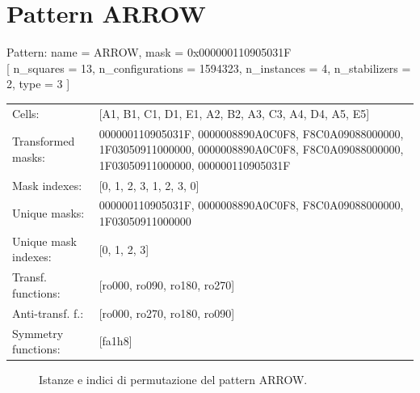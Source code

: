 \newpage

\section{Pattern ARROW}

\begin{tcolorbox}[sharp corners, fontupper=\ttfamily\small, colback=white]
  \noindent Pattern: name = ARROW, mask = 0x000000110905031F\\
  {[} n\_squares = 13, n\_configurations = 1594323,
  n\_instances = 4, n\_stabilizers = 2, type = 3 { ]}\\[1.0ex]
  \begin{tabularx}{\textwidth}{@{} p{3.5cm} X @{}}
    Cells:               & {[}A1, B1, C1, D1, E1, A2, B2, A3, C3, A4, D4, A5, E5{]}\\[0.5ex]
    Transformed masks:   & 000000110905031F, 0000008890A0C0F8, F8C0A09088000000, 1F03050911000000, 0000008890A0C0F8, F8C0A09088000000, 1F03050911000000, 000000110905031F\\[0.5ex]
    Mask indexes:        & {[}0, 1, 2, 3, 1, 2, 3, 0{]}\\[0.5ex]
    Unique masks:        & 000000110905031F, 0000008890A0C0F8, F8C0A09088000000, 1F03050911000000\\[0.5ex]
    Unique mask indexes: & {[}0, 1, 2, 3{]}\\[0.5ex]
    Transf. functions:   & {[}ro000, ro090, ro180, ro270{]}\\[0.5ex]
    Anti-transf. f.:     & {[}ro000, ro270, ro180, ro090{]}\\[0.5ex]
    Symmetry functions:  & {[}fa1h8{]}\\[0.5ex]
  \end{tabularx}
\end{tcolorbox}

\begin{figure}[htbp]
  \centering
   \hfill
   \hfill
   \hfill
  \vspace{0.3cm}
   \hfill
   \hfill
   \hfill
  \caption{Istanze e indici di permutazione del pattern ARROW.}
\end{figure}

